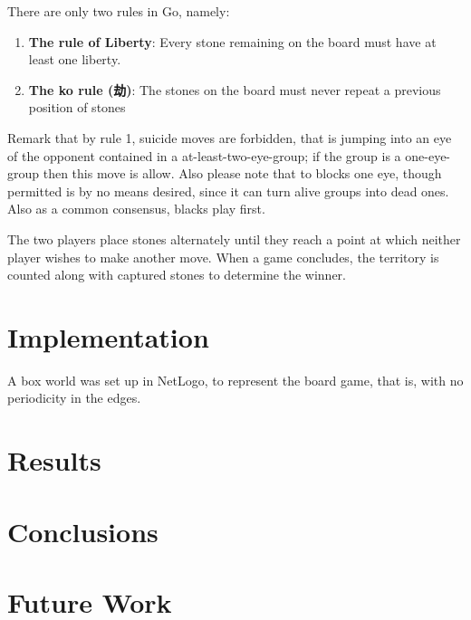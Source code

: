 \documentclass[a4paper,10pt,twocolumn]{article}
\begin{document}
\begin{CJK*}{UTF8}{gbsn}
There are only two rules in Go, namely: 

\begin{enumerate}
\item \textbf{The rule of Liberty}: Every stone remaining on the board must have at least one liberty.
\item \textbf{The ko rule (劫)}: The stones on the board must never repeat a previous position of stones
\end{enumerate}

Remark that by rule 1, suicide moves are forbidden, that is jumping into an eye of the opponent contained in a at-least-two-eye-group; if the group is a one-eye-group then this move is allow. Also please note that to blocks one eye, though permitted is by no means desired, since it can turn alive groups into dead ones. Also as a common consensus, blacks play first.   

The two players place stones alternately until they reach a point at which neither player wishes to make another move. When a game concludes, the territory is counted along with captured stones to determine the winner. 

\section{Implementation}
A box world was set up in NetLogo, to represent the board game, that is, with no periodicity in the edges.  

\section{Results}

\section{Conclusions}

\section{Future Work}





\end{CJK*}
\end{document}
